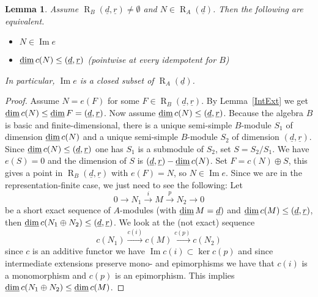 \documentclass[11pt,a4paper]{amsart}
\theoremstyle{plain}
\newtheorem{lem}[thm]{Lemma}
\theoremstyle{definition}
\begin{document}
\begin{lem} 
\label{ImRes} 
Assume ${\operatorname{R}_B(\underline{d},\underline{r})}\neq \emptyset $ and $N\in {\operatorname{R}_A(\underline{d})}$. Then the following are equivalent. 
\begin{itemize}
\item[(1)] $N\in \operatorname{Im} {e} $
\item[(2)] $\operatorname{\rm \underline{dim}} {c} (N) \leq ({\underline{d}}, {\underline{r}} )$ (pointwise at every idempotent for $B$)
\end{itemize}
In particular, $\operatorname{Im} {e} $ is a closed subset of ${\operatorname{R}_A(\underline{d})}$.
\end{lem}

\begin{proof}
Assume $N= {e} (F)$ for some $F\in {\operatorname{R}_B(\underline{d},\underline{r})}$. 
By Lemma~\ref{IntExt} we get $\operatorname{\rm \underline{dim}} {c} (N) \leq \operatorname{\rm \underline{dim}} F= ({\underline{d}} , {\underline{r}})$. 
Now assume $\operatorname{\rm \underline{dim}} {c} (N) \leq ({\underline{d}} , {\underline{r}})$. 
Because the algebra $B$ is basic and finite-dimensional, there is a unique semi-simple $B$-module $S_1$ of dimension $\operatorname{\rm \underline{dim}} {c} (N)$ and a unique semi-simple $B$-module $S_2$ of dimension 
$({\underline{d}}, {\underline{r}} )$. Since $\operatorname{\rm \underline{dim}} {c} (N) \leq ({\underline{d}}, {\underline{r}})$ one has $S_1$ is a submodule of $S_2$, set 
$S= S_2/S_1$. We have ${e} (S)=0$ and the dimension of $S$ is $({\underline{d}}, {\underline{r}})-\operatorname{\rm \underline{dim}} {c} (N)$. 
Set $F= {c} (N) \oplus S$, this gives a point in ${\operatorname{R}_B(\underline{d},\underline{r})}$ with ${e} (F) =N$, so $N \in \operatorname{Im} {e}$. 
Since we are in the representation-finite case, we just need to see the following: 
Let 
\[0\to N_1\xrightarrow{i}M \xrightarrow{p} N_2\to 0\] 
be a short exact sequence of $A$-modules (with $\operatorname{\rm \underline{dim}} M={\underline{d}})$ and $\operatorname{\rm \underline{dim}} {c} (M) \leq ({\underline{d}}, {\underline{r}})$, 
then $\operatorname{\rm \underline{dim}} {c} (N_1\oplus N_2) \leq ({\underline{d}}, {\underline{r}})$. 
We look at the (not exact) sequence 
\[ 
{c} (N_1)\xrightarrow{{c} (i)} {c} (M) \xrightarrow{{c} (p)} {c} (N_2)
\]
since ${c} $ is an additive functor we have 
$\operatorname{Im} {c} (i) \subset \operatorname{ker} {c} (p)$ and since intermediate extensions preserve mono- and epimorphisms we have that ${c}(i)$ is a monomorphism and ${c} (p) $ is an epimorphism. 
This implies $\operatorname{\rm \underline{dim}} {c} (N_1\oplus N_2) \leq \operatorname{\rm \underline{dim}} {c} (M)$. 
\end{proof}
\end{document}

